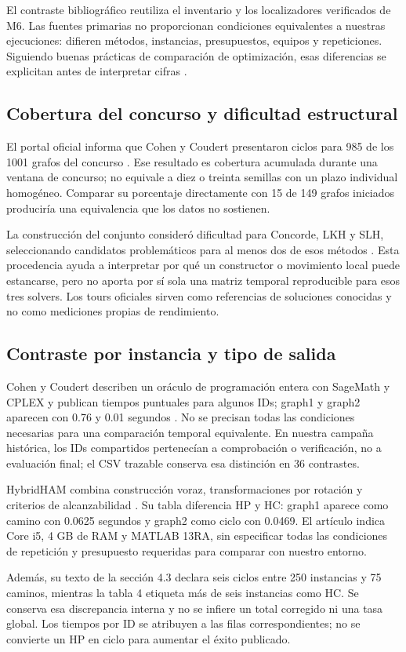 El contraste bibliográfico reutiliza el inventario y los localizadores verificados de M6. Las fuentes primarias no proporcionan condiciones equivalentes a nuestras ejecuciones: difieren métodos, instancias, presupuestos, equipos y repeticiones. Siguiendo buenas prácticas de comparación de optimización, esas diferencias se explicitan antes de interpretar cifras \citep{beiranvand2017BestPractices}.

\subsection{Cobertura del concurso y dificultad estructural}
El portal oficial informa que Cohen y Coudert presentaron ciclos para 985 de los 1001 grafos del concurso \citep{flindersFhcpChallenge}. Ese resultado es cobertura acumulada durante una ventana de concurso; no equivale a diez o treinta semillas con un plazo individual homogéneo. Comparar su porcentaje directamente con 15 de 149 grafos iniciados produciría una equivalencia que los datos no sostienen.

La construcción del conjunto consideró dificultad para Concorde, LKH y SLH, seleccionando candidatos problemáticos para al menos dos de esos métodos \citep{haythorpe2018Fhcp}. Esta procedencia ayuda a interpretar por qué un constructor o movimiento local puede estancarse, pero no aporta por sí sola una matriz temporal reproducible para esos tres solvers. Los tours oficiales sirven como referencias de soluciones conocidas y no como mediciones propias de rendimiento.

\subsection{Contraste por instancia y tipo de salida}
Cohen y Coudert describen un oráculo de programación entera con SageMath y CPLEX y publican tiempos puntuales para algunos IDs; graph1 y graph2 aparecen con 0.76 y 0.01 segundos \citep{cohenCoudert2017Challenge}. No se precisan todas las condiciones necesarias para una comparación temporal equivalente. En nuestra campaña histórica, los IDs compartidos pertenecían a comprobación o verificación, no a evaluación final; el CSV trazable conserva esa distinción en 36 contrastes.

HybridHAM combina construcción voraz, transformaciones por rotación y criterios de alcanzabilidad \citep{seeja2018HybridHam}. Su tabla diferencia HP y HC: graph1 aparece como camino con 0.0625 segundos y graph2 como ciclo con 0.0469. El artículo indica Core i5, 4 GB de RAM y MATLAB 13RA, sin especificar todas las condiciones de repetición y presupuesto requeridas para comparar con nuestro entorno.

Además, su texto de la sección 4.3 declara seis ciclos entre 250 instancias y 75 caminos, mientras la tabla 4 etiqueta más de seis instancias como HC. Se conserva esa discrepancia interna y no se infiere un total corregido ni una tasa global. Los tiempos por ID se atribuyen a las filas correspondientes; no se convierte un HP en ciclo para aumentar el éxito publicado.

